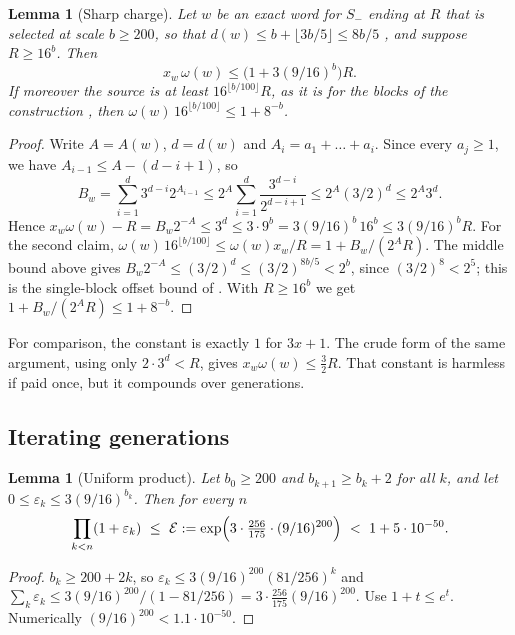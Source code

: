 \documentclass[11pt]{amsart}
\newtheorem{lemma}[theorem]{Lemma}
\theoremstyle{definition}
\theoremstyle{remark}
\newcommand{\Sm}{S_{-}}
\newcommand{\E}{\mathcal{E}}
\begin{document}
\begin{lemma}[Sharp charge]\label{lem:sharp-charge}
Let $w$ be an exact word for $\Sm$ ending at $R$ that is selected at scale $b\ge200$, so that
$d(w)\le b+\lfloor3b/5\rfloor\le 8b/5$ \cite[\S3]{MazurM1}, and suppose $R\ge16^{b}$. Then
\[
  x_w\,\omega(w)\le\bigl(1+3(9/16)^{b}\bigr)R .
\]
If moreover the source is at least $16^{\lfloor b/100\rfloor}R$, as it is for the blocks of the
construction \cite[(3.5)]{MazurM1}, then $\omega(w)\,16^{\lfloor b/100\rfloor}\le1+8^{-b}$.
\end{lemma}

\begin{proof}
Write $A=A(w)$, $d=d(w)$ and $A_i=a_1+\dots+a_i$. Since every $a_j\ge1$, we have
$A_{i-1}\le A-(d-i+1)$, so
\[
  B_w=\sum_{i=1}^{d}3^{d-i}2^{A_{i-1}}\le2^{A}\sum_{i=1}^{d}\frac{3^{d-i}}{2^{d-i+1}}\le2^{A}(3/2)^{d}
  \le2^{A}3^{d}.
\]
Hence $x_w\omega(w)-R=B_w2^{-A}\le3^{d}\le3\cdot9^{b}=3(9/16)^{b}\,16^{b}\le3(9/16)^{b}R$. For
the second claim, $\omega(w)\,16^{\lfloor b/100\rfloor}\le\omega(w)x_w/R=1+B_w/(2^{A}R)$. The
middle bound above gives $B_w2^{-A}\le(3/2)^{d}\le(3/2)^{8b/5}<2^{b}$, since $(3/2)^8<2^5$; this is
the single-block offset bound of \cite[proof of Proposition~3.1]{MazurM1}. With
$R\ge16^{b}$ we get $1+B_w/(2^{A}R)\le1+8^{-b}$.
\end{proof}

For comparison, the constant is exactly $1$ for $3x+1$. The crude form of the same argument, using
only $2\cdot3^{d}<R$, gives $x_w\omega(w)\le\frac32R$. That constant is harmless if paid once, but
it compounds over generations.

\subsection{Iterating generations}

\begin{lemma}[Uniform product]\label{lem:product}
Let $b_0\ge200$ and $b_{k+1}\ge b_k+2$ for all $k$, and let $0\le\varepsilon_k\le3(9/16)^{b_k}$.
Then for every $n$
\[
  \prod_{k<n}(1+\varepsilon_k)\ \le\ \E:=\exp\Bigl(3\cdot\tfrac{256}{175}\cdot(9/16)^{200}\Bigr)
  \ <\ 1+5\cdot10^{-50}.
\]
\end{lemma}

\begin{proof}
$b_k\ge200+2k$, so $\varepsilon_k\le3(9/16)^{200}(81/256)^{k}$ and
$\sum_k\varepsilon_k\le3(9/16)^{200}/(1-81/256)=3\cdot\frac{256}{175}(9/16)^{200}$. Use $1+t\le
e^{t}$. Numerically $(9/16)^{200}<1.1\cdot10^{-50}$.
\end{proof}
\end{document}

